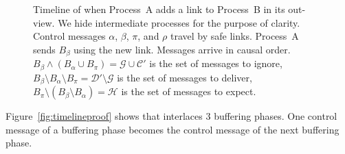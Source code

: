 %     

\begin{figure}
  \begin{center}
    
    \caption{\label{fig:timelineproof}\label{fig:timeline}Timeline of
      \RPCBROADCAST when Process~A adds a link to Process~B in its out-view. We
      hide intermediate processes for the purpose of clarity. Control messages
      $\alpha$, $\beta$, $\pi$, and $\rho$ travel by safe links. Process~A sends
      $B_\beta$ using the new link. Messages arrive in causal order.
      $B_\beta \wedge (B_\alpha \cup B_\pi) = \mathcal{G} \cup \mathcal{C}'$ is
      the set of messages to ignore,
      $B_\beta \setminus B_\alpha \setminus B_\pi = \mathcal{D}'\setminus
      \mathcal{G}$
      is the set of messages to deliver,
      $B_\pi \setminus (B_\beta \setminus B_\alpha) = \mathcal{H}$ is the set of
      messages to expect.}
  \end{center}
\end{figure}

Figure~\ref{fig:timelineproof} shows that \RPCBROADCAST interlaces 3 buffering
phases. One control message of a buffering phase becomes the control message of
the next buffering phase.

\begin{theorem}
\end{theorem}

